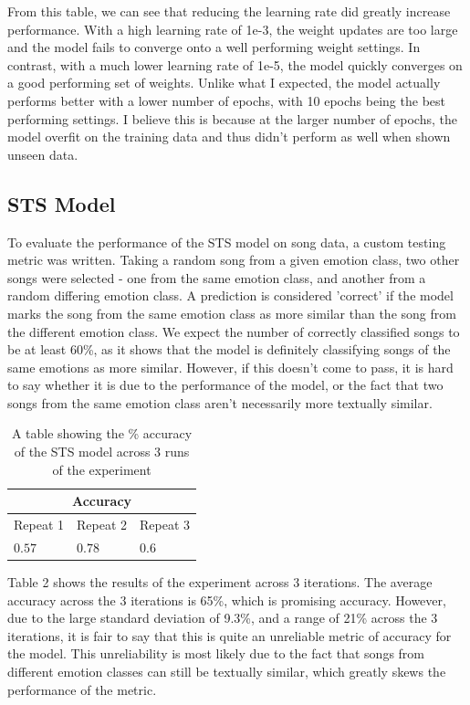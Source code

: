 \documentclass[11pt]{article}
\begin{document}
From this table, we can see that reducing the learning rate did greatly increase performance. With a high learning rate of 1e-3, the weight updates are too large and the model fails to converge onto a well performing weight settings. In contrast, with a much lower learning rate of 1e-5, the model quickly converges on a good performing set of weights. Unlike what I expected, the model actually performs better with a lower number of epochs, with 10 epochs being the best performing settings. I believe this is because at the larger number of epochs, the model overfit on the training data and thus didn't perform as well when shown unseen data.

\subsection{STS Model}


To evaluate the performance of the STS model on song data, a custom testing metric was written. Taking a random song from a given emotion class, two other songs were selected - one from the same emotion class, and another from a random differing emotion class. A prediction is considered 'correct' if the model marks the song from the same emotion class as more similar than the song from the different emotion class.
We expect the number of correctly classified songs to be at least 60\%, as it shows that the model is definitely classifying songs of the same emotions as more similar. However, if this doesn't come to pass, it is hard to say whether it is due to the performance of the model, or the fact that two songs from the same emotion class aren't necessarily more textually similar.

\begin{table}[H]
    \centering
    \caption{A table showing the \% accuracy of the STS model across 3 runs of the experiment}
    \begin{tabularx}{0.48\textwidth}{|X X X|} 
      \hline
      \multicolumn{3}{|c|}{Accuracy} \\ \hline 
      Repeat 1 & Repeat 2 & Repeat 3 \\ \hline
      $0.57$&$0.78$ &$0.6$ \\ \hline
    \end{tabularx}
\end{table}

Table 2 shows the results of the experiment across 3 iterations. The average accuracy across the 3 iterations is 65\%, which is promising accuracy. However, due to the large standard deviation of 9.3\%, and a range of 21\% across the 3 iterations, it is fair to say that this is quite an unreliable metric of accuracy for the model. This unreliability is most likely due to the fact that songs from different emotion classes can still be textually similar, which greatly skews the performance of the metric.
\end{document}

